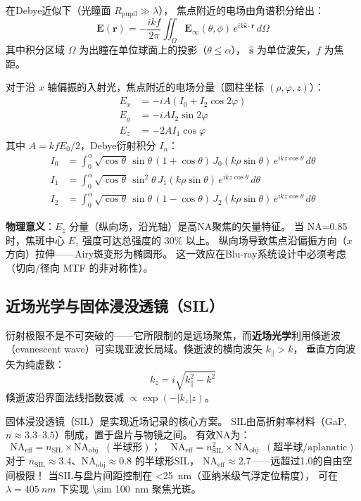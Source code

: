 \documentclass[11pt,a4paper,twoside]{article}
\theoremstyle{definition}\newtheorem{definition}{定义}[section]
\theoremstyle{plain}\newtheorem{theorem}{定理}[section]
\theoremstyle{remark}\newtheorem{remark}{注解}[section]
\begin{document}
在Debye近似下（光瞳面 $R_{\text{pupil}} \gg \lambda$），
焦点附近的电场由角谱积分给出：
\begin{equation}\label{eq:debye}
  \mathbf{E}(\mathbf{r}) = -\frac{i k f}{2\pi}
  \iint_{\Omega} \mathbf{E}_\infty(\theta, \phi)\,
  e^{i k \hat{\mathbf{s}} \cdot \mathbf{r}}\, d\Omega
\end{equation}
其中积分区域 $\Omega$ 为出瞳在单位球面上的投影（$\theta \le \alpha$），
$\hat{\mathbf{s}}$ 为单位波矢，$f$ 为焦距。

对于沿 $x$ 轴偏振的入射光，焦点附近的电场分量（圆柱坐标 $(\rho, \varphi, z)$）：
\begin{align}
  E_x &= -i A (I_0 + I_2 \cos 2\varphi) \\
  E_y &= -i A I_2 \sin 2\varphi \\
  E_z &= -2 A I_1 \cos \varphi
\end{align}
其中 $A = k f E_0 / 2$，Debye衍射积分 $I_n$：
\begin{align}
  I_0 &= \int_0^\alpha \sqrt{\cos\theta}\,\sin\theta\,(1+\cos\theta)\,
        J_0(k\rho\sin\theta)\, e^{i k z \cos\theta}\, d\theta \\
  I_1 &= \int_0^\alpha \sqrt{\cos\theta}\,\sin^2\theta\,
        J_1(k\rho\sin\theta)\, e^{i k z \cos\theta}\, d\theta \\
  I_2 &= \int_0^\alpha \sqrt{\cos\theta}\,\sin\theta\,(1-\cos\theta)\,
        J_2(k\rho\sin\theta)\, e^{i k z \cos\theta}\, d\theta
\end{align}

\textbf{物理意义}：$E_z$ 分量（纵向场，沿光轴）是高NA聚焦的矢量特征。
当 NA=0.85 时，焦斑中心 $E_z$ 强度可达总强度的 30\% 以上。
纵向场导致焦点沿偏振方向（$x$方向）拉伸——Airy斑变形为椭圆形。
这一效应在Blu-ray系统设计中必须考虑（切向/径向 MTF 的非对称性）。

\subsection{近场光学与固体浸没透镜（SIL）}

衍射极限不是不可突破的——它所限制的是远场聚焦，而\textbf{近场光学}利用倏逝波
（evanescent wave）可实现亚波长局域。倏逝波的横向波矢 $k_\parallel > k$，
垂直方向波矢为纯虚数：
\begin{equation}
  k_z = i\sqrt{k_\parallel^2 - k^2}
\end{equation}
倏逝波沿界面法线指数衰减 $\propto \exp(-|k_z| z)$。

固体浸没透镜（SIL）是实现近场记录的核心方案。
SIL由高折射率材料（GaP, $n \approx 3.3$--$3.5$）制成，置于盘片与物镜之间。
有效NA为：
\begin{equation}
  \text{NA}_{\text{eff}} = n_{\text{SIL}} \times \text{NA}_{\text{obj}}
  \;\;(\text{半球形})；\quad
  \text{NA}_{\text{eff}} = n_{\text{SIL}}^2 \times \text{NA}_{\text{obj}}
  \;\;(\text{超半球/aplanatic})
\end{equation}
对于 $n_{\text{SIL}} \approx 3.4$、NA$_{\text{obj}} \approx 0.8$ 的半球形SIL，
$\text{NA}_{\text{eff}} \approx 2.7$——远超过1.0的自由空间极限！
当SIL与盘片间距控制在 \SI{<25}{nm}（亚纳米级气浮定位精度），
可在 $\lambda = \SI{405}{nm}$ 下实现 \SI{\sim 100}{nm} 聚焦光斑。
\end{document}
